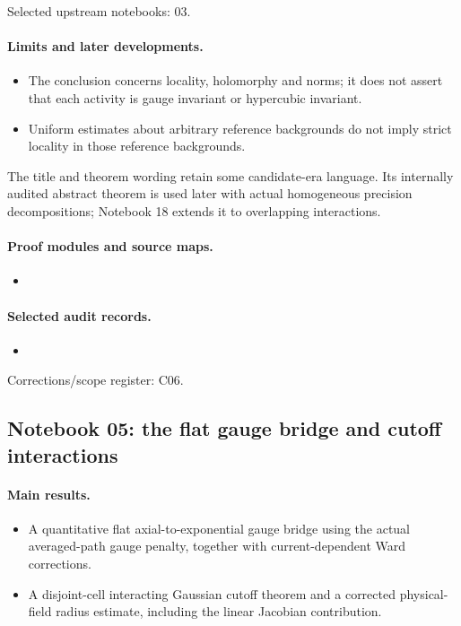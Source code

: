 \documentclass[11pt]{article}
\theoremstyle{remark}
\begin{document}
Selected upstream notebooks: 03.\par

\paragraph{Limits and later developments.}
\begin{itemize}
\item The conclusion concerns locality, holomorphy and norms; it does not assert that each activity is gauge invariant or hypercubic invariant.
\item Uniform estimates about arbitrary reference backgrounds do not imply strict locality in those reference backgrounds.
\end{itemize}

The title and theorem wording retain some candidate-era language. Its internally audited abstract theorem is used later with actual homogeneous precision decompositions; Notebook 18 extends it to overlapping interactions.

\paragraph{Proof modules and source maps.}
\begingroup\small
\begin{itemize}
\item {}
\end{itemize}
\endgroup

\paragraph{Selected audit records.}
\begingroup\small
\begin{itemize}
\item {}
\end{itemize}
\endgroup
Corrections/scope register: C06.\par

\subsection{Notebook 05: the flat gauge bridge and cutoff interactions}
\label{hnc-05}
\noindent{}\par

\paragraph{Main results.}
\begin{itemize}
\item A quantitative flat axial-to-exponential gauge bridge using the actual averaged-path gauge penalty, together with current-dependent Ward corrections.
\item A disjoint-cell interacting Gaussian cutoff theorem and a corrected physical-field radius estimate, including the linear Jacobian contribution.
\end{itemize}
\end{document}

